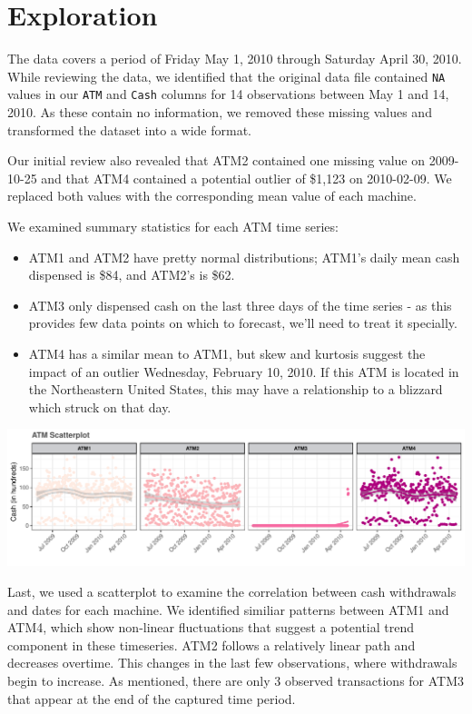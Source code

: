 \documentclass[openany]{book}
\providecommand{\tightlist}{%
  \setlength{\itemsep}{0pt}\setlength{\parskip}{0pt}}
\begin{document}
\hypertarget{exploration}{%
\section{Exploration}\label{exploration}}

The data covers a period of Friday May 1, 2010 through Saturday April
30, 2010. While reviewing the data, we identified that the original data
file contained \texttt{NA} values in our \texttt{ATM} and \texttt{Cash}
columns for 14 observations between May 1 and 14, 2010. As these contain
no information, we removed these missing values and transformed the
dataset into a wide format.

Our initial review also revealed that ATM2 contained one missing value
on 2009-10-25 and that ATM4 contained a potential outlier of \$1,123 on
2010-02-09. We replaced both values with the corresponding mean value of
each machine.

We examined summary statistics for each ATM time series:

\begin{itemize}
\tightlist
\item
  ATM1 and ATM2 have pretty normal distributions; ATM1's daily mean cash
  dispensed is \$84, and ATM2's is \$62.
\item
  ATM3 only dispensed cash on the last three days of the time series -
  as this provides few data points on which to forecast, we'll need to
  treat it specially.
\item
  ATM4 has a similar mean to ATM1, but skew and kurtosis suggest the
  impact of an outlier Wednesday, February 10, 2010. If this ATM is
  located in the Northeastern United States, this may have a
  relationship to a blizzard which struck on that day.
\end{itemize}

\includegraphics{Group2_Project1_Fall2019_files/figure-latex/unnamed-chunk-3-1.pdf}

Last, we used a scatterplot to examine the correlation between cash
withdrawals and dates for each machine. We identified similiar patterns
between ATM1 and ATM4, which show non-linear fluctuations that suggest a
potential trend component in these timeseries. ATM2 follows a relatively
linear path and decreases overtime. This changes in the last few
observations, where withdrawals begin to increase. As mentioned, there
are only 3 observed transactions for ATM3 that appear at the end of the
captured time period.
\end{document}
